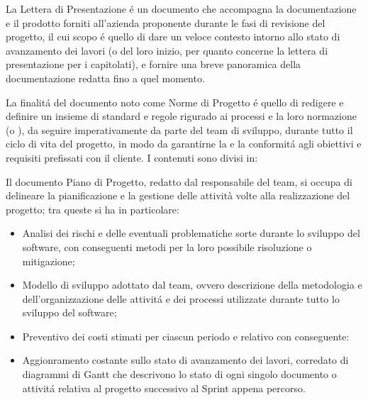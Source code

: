 La Lettera di Presentazione é un documento che accompagna la documentazione e il prodotto forniti all'azienda proponente durante le fasi di revisione del progetto, il cui scopo é quello di dare un veloce contesto intorno allo stato di avanzamento dei lavori (o del loro inizio, per quanto concerne la lettera di presentazione per i capitolati), e fornire una breve panoramica della documentazione redatta fino a quel momento. 

La finalitá del documento noto come Norme di Progetto é quello di redigere e definire un insieme di standard e regole rigurado ai processi e la loro normazione (o ), da seguire imperativamente da parte del team di sviluppo, durante tutto il ciclo di vita del progetto, in modo da garantirne la  e la conformitá agli obiettivi e requisiti prefissati con il cliente. I contenuti sono divisi in:

Il documento Piano di Progetto, redatto dal responsabile del team, si occupa di delineare la pianificazione e la gestione delle attività volte alla realizzazione del progetto; tra queste si ha in particolare:
\begin{itemize}
    \item Analisi dei rischi e delle eventuali problematiche sorte durante lo sviluppo del software, con conseguenti metodi per la loro possibile risoluzione o mitigazione;
    \item Modello di sviluppo adottato dal team, ovvero descrizione della metodologia e dell'organizzazione delle attivitá e dei processi utilizzate durante tutto lo sviluppo del software; 
    \item Preventivo dei costi stimati per ciascun periodo e relativo  con conseguente:
    \item Aggionramento costante sullo stato di avanzamento dei lavori, corredato di diagrammi di Gantt che descrivono lo stato di ogni singolo documento o attivitá relativa al progetto successivo al Sprint appena percorso.
\end{itemize}


